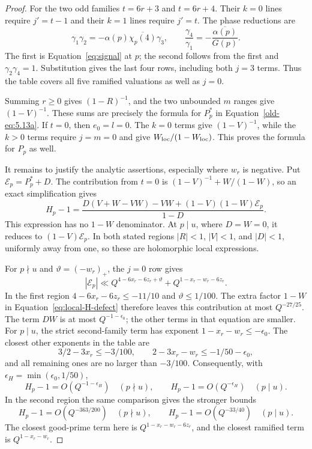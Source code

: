 \documentclass[11pt,a4paper]{article}
\numberwithin{equation}{section}
\numberwithin{figure}{section}
\theoremstyle{definition}
\theoremstyle{remark}
\begin{document}
\begin{proof}
For the two odd families $t=6r+3$ and $t=6r+4$.  Their $k=0$
lines require $j'=t-1$ and their $k=1$ lines require $j'=t$.
The phase reductions are
\[
 \gamma_1\gamma_2
       =-\alpha(p)\overline{\chi_p(4)}\gamma_3,
 \qquad
 \frac{\gamma_4}{\gamma_1}
       =-\frac{\overline{\alpha(p)}}{G(p)}.
\]
The first is Equation~\eqref{eq:signal} at $p$; the second follows
from the first and $\gamma_2\gamma_4=1$.  Substitution gives the
last four rows, including both $j=3$ terms.  Thus the table covers
all five ramified valuations as well as $j=0$.

Summing $r\ge0$ gives $(1-R)^{-1}$, and the two unbounded $m$
ranges give $(1-V)^{-1}$.  These sums are precisely the formula for
$P_p^*$ in Equation~\eqref{old-eq:5.13a}.  If $t=0$, then
$e_0=l=0$.  The $k=0$ terms give $(1-V)^{-1}$, while the $k>0$
terms require $j=m=0$ and give $W_{\rm loc}/(1-W_{\rm loc})$.
This proves the
formula for $P_p$ as well.

It remains to justify the analytic assertions, especially where
$w_r$ is negative.  Put $\mathcal E_p=P_p^*+D$.  The contribution
from $t=0$ is $(1-V)^{-1}+W/(1-W)$, so an exact simplification gives
\begin{equation}\label{eq:local-H-defect}
 H_p-1=
 \frac{D(V+W-VW)-VW+(1-V)(1-W)\mathcal E_p}{1-D}.
\end{equation}
This expression has no $1-W$ denominator.  At $p\mid u$, where
$D=W=0$, it reduces to $(1-V)\mathcal E_p$.  In both stated regions
$|R|<1$, $|V|<1$, and $|D|<1$, uniformly away from one, so these
are holomorphic local expressions.

For $p\nmid u$ and $\vartheta=(-w_r)_+$, the $j=0$ row gives
\[
 |\mathcal E_p|\ll
 Q^{4-6x_r-6z_r+\vartheta}+Q^{1-x_r-w_r-6z_r}.
\]
In the first region $4-6x_r-6z_r\le-11/10$ and
$\vartheta\le1/100$.  The extra factor $1-W$ in
Equation~\eqref{eq:local-H-defect} therefore leaves this contribution
at most $Q^{-27/25}$.  The term $DW$ is at most
$Q^{-1-\epsilon_0}$; the other terms in that equation are smaller.
For $p\mid u$, the strict second-family term has exponent
$1-x_r-w_r\le-\epsilon_0$.  The closest other exponents in the
table are
\[
 3/2-3x_r\le-3/100,\qquad
 2-3x_r-w_r\le-1/50-\epsilon_0,
\]
and all remaining ones are no larger than $-3/100$.
Consequently, with $\epsilon_H=\min(\epsilon_0,1/50)$,
\[
 H_p-1=O(Q^{-1-\epsilon_H})\quad(p\nmid u),\qquad
 H_p-1=O(Q^{-\epsilon_H})\quad(p\mid u).
\]
In the second region the same comparison gives the stronger bounds
\[
 H_p-1=O(Q^{-363/200})\quad(p\nmid u),\qquad
 H_p-1=O(Q^{-33/40})\quad(p\mid u).
\]
The closest good-prime term here is
$Q^{1-x_r-w_r-6z_r}$, and the closest ramified term is
$Q^{1-x_r-w_r}$.


\end{proof}
\end{document}
